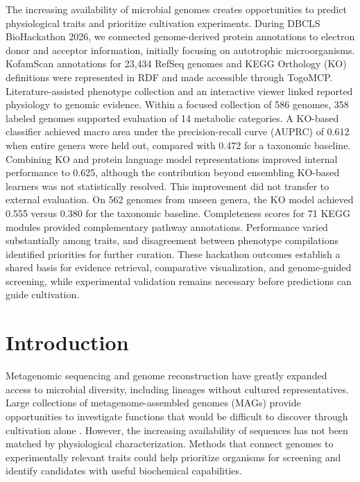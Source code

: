 \documentclass[10pt,a4paper,onecolumn]{article}
\begin{document}
The increasing availability of microbial genomes creates opportunities
to predict physiological traits and prioritize cultivation experiments.
During DBCLS BioHackathon 2026, we connected genome-derived protein
annotations to electron donor and acceptor information, initially
focusing on autotrophic microorganisms. KofamScan annotations for 23,434
RefSeq genomes and KEGG Orthology (KO) definitions were represented in
RDF and made accessible through TogoMCP. Literature-assisted phenotype
collection and an interactive viewer linked reported physiology to
genomic evidence. Within a focused collection of 586 genomes, 358
labeled genomes supported evaluation of 14 metabolic categories. A
KO-based classifier achieved macro area under the precision-recall curve
(AUPRC) of 0.612 when entire genera were held out, compared with 0.472
for a taxonomic baseline. Combining KO and protein language model
representations improved internal performance to 0.625, although the
contribution beyond ensembling KO-based learners was not statistically
resolved. This improvement did not transfer to external evaluation. On
562 genomes from unseen genera, the KO model achieved 0.555 versus 0.380
for the taxonomic baseline. Completeness scores for 71 KEGG modules
provided complementary pathway annotations. Performance varied
substantially among traits, and disagreement between phenotype
compilations identified priorities for further curation. These hackathon
outcomes establish a shared basis for evidence retrieval, comparative
visualization, and genome-guided screening, while experimental
validation remains necessary before predictions can guide cultivation.

\section{Introduction}\label{introduction}

Metagenomic sequencing and genome reconstruction have greatly expanded
access to microbial diversity, including lineages without cultured
representatives. Large collections of metagenome-assembled genomes
(MAGs) provide opportunities to investigate functions that would be
difficult to discover through cultivation alone \autocite{Nayfach2021}.
However, the increasing availability of sequences has not been matched
by physiological characterization. Methods that connect genomes to
experimentally relevant traits could help prioritize organisms for
screening and identify candidates with useful biochemical capabilities.
\end{document}
